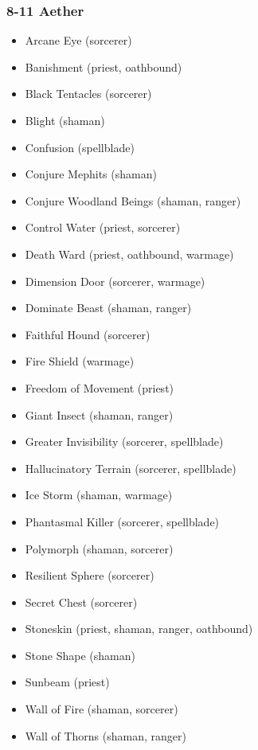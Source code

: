\subsubsection{8-11 Aether}
\begin{itemize}
\item Arcane Eye (sorcerer)
\item Banishment (priest, oathbound)
\item Black Tentacles (sorcerer)
\item Blight (shaman)
\item Confusion (spellblade)
\item Conjure Mephits (shaman)
\item Conjure Woodland Beings (shaman, ranger)
\item Control Water (priest, sorcerer)
\item Death Ward (priest, oathbound, warmage)
\item Dimension Door (sorcerer, warmage)
\item Dominate Beast (shaman, ranger)
\item Faithful Hound (sorcerer)
\item Fire Shield (warmage)
\item Freedom of Movement (priest)
\item Giant Insect (shaman, ranger)
\item Greater Invisibility (sorcerer, spellblade)
\item Hallucinatory Terrain (sorcerer, spellblade)
\item Ice Storm (shaman, warmage)
\item Phantasmal Killer (sorcerer, spellblade)
\item Polymorph (shaman, sorcerer)
\item Resilient Sphere (sorcerer)
\item Secret Chest (sorcerer)
\item Stoneskin (priest, shaman, ranger, oathbound)
\item Stone Shape (shaman)
\item Sunbeam (priest)
\item Wall of Fire (shaman, sorcerer)
\item Wall of Thorns (shaman, ranger) 
\end{itemize}

